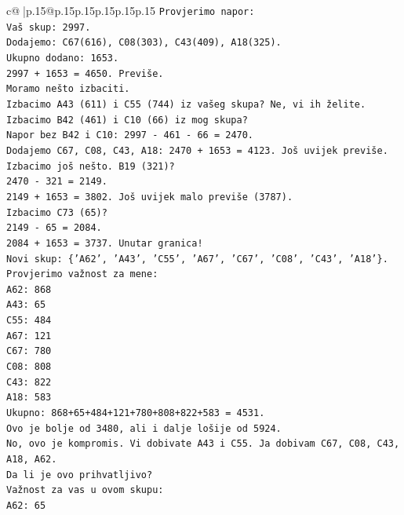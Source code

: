 \documentclass{article}
\begin{document}
{\begin{supertabular}{c@{$\;$}|p{.15\linewidth}@{}p{.15\linewidth}p{.15\linewidth}p{.15\linewidth}p{.15\linewidth}p{.15\linewidth}}
{{{\texttt{Provjerimo napor:} \\
\texttt{Vaš skup: 2997.} \\
\texttt{Dodajemo: C67(616), C08(303), C43(409), A18(325).} \\
\texttt{Ukupno dodano: 1653.} \\
\texttt{2997 + 1653 = 4650. Previše.} \\
\texttt{Moramo nešto izbaciti.} \\
\texttt{Izbacimo A43 (611) i C55 (744) iz vašeg skupa? Ne, vi ih želite.} \\
\texttt{Izbacimo B42 (461) i C10 (66) iz mog skupa?} \\
\texttt{Napor bez B42 i C10: 2997 {-} 461 {-} 66 = 2470.} \\
\texttt{Dodajemo C67, C08, C43, A18: 2470 + 1653 = 4123. Još uvijek previše.} \\
\texttt{Izbacimo još nešto. B19 (321)?} \\
\texttt{2470 {-} 321 = 2149.} \\
\texttt{2149 + 1653 = 3802. Još uvijek malo previše (3787).} \\
\texttt{Izbacimo C73 (65)?} \\
\texttt{2149 {-} 65 = 2084.} \\
\texttt{2084 + 1653 = 3737. Unutar granica!} \\
\texttt{Novi skup: \{'A62', 'A43', 'C55', 'A67', 'C67', 'C08', 'C43', 'A18'\}.} \\
\texttt{Provjerimo važnost za mene:} \\
\texttt{A62: 868} \\
\texttt{A43: 65} \\
\texttt{C55: 484} \\
\texttt{A67: 121} \\
\texttt{C67: 780} \\
\texttt{C08: 808} \\
\texttt{C43: 822} \\
\texttt{A18: 583} \\
\texttt{Ukupno: 868+65+484+121+780+808+822+583 = 4531.} \\
\texttt{Ovo je bolje od 3480, ali i dalje lošije od 5924.} \\
\texttt{No, ovo je kompromis. Vi dobivate A43 i C55. Ja dobivam C67, C08, C43, A18, A62.} \\
\texttt{Da li je ovo prihvatljivo?} \\
\texttt{Važnost za vas u ovom skupu:} \\
\texttt{A62: 65} \\
}}}
\end{supertabular}}
\end{document}
